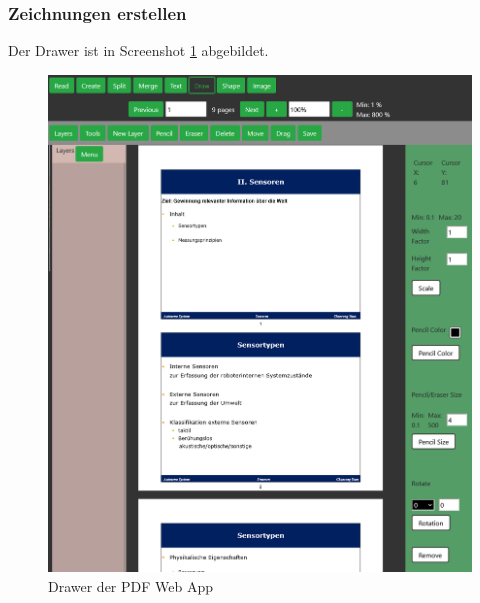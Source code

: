 \subsubsection{Zeichnungen erstellen}
Der Drawer ist in Screenshot \ref{fig:drawer} abgebildet. 

\begin{figure}[!htbp]
	\centering
	\includegraphics[width=1\textwidth]{"images/drawer.png"}
	\caption{Drawer der PDF Web App}
	\label{fig:drawer}
\end{figure}

